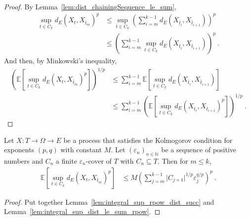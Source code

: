 \begin{proof}

By Lemma~\ref{lem:dist_chainingSequence_le_sum},
\begin{align*}
  \sup_{t \in C_k} d_E(X_t, X_{\bar{t}_m})^p
  &\le \sup_{t \in C_k} \left( \sum_{i=m}^{k-1} d_E(X_{\bar{t}_i}, X_{\bar{t}_{i+1}}) \right)^p
  \\
  &\le \left( \sum_{i=m}^{k-1} \sup_{t \in C_k} d_E(X_{\bar{t}_i}, X_{\bar{t}_{i+1}}) \right)^p
  \: .
\end{align*}
And then, by Minkowski's inequality,
\begin{align*}
  \left(\mathbb{E} \left[\sup_{t \in C_k} d_E(X_t, X_{\bar{t}_m})^p \right]\right)^{1/p}
  &\le \sum_{i=m}^{k-1} \mathbb{E} \left[\sup_{t \in C_k} d_E(X_{\bar{t}_i}, X_{\bar{t}_{i+1}}) \right]
  \\
  &\le \sum_{i=m}^{k-1} \left( \mathbb{E}\left[\sup_{t \in C_k} d_E(X_{\bar{t}_i}, X_{\bar{t}_{i+1}})^p \right] \right)^{1/p}
  \: .
\end{align*}
\end{proof}


\begin{lemma}\label{lem:integral_sup_rpow_dist_le_sum}
  \leanok
Let $X : T \to \Omega \to E$ be a process that satisfies the Kolmogorov condition for exponents $(p,q)$ with constant $M$.
Let $(\varepsilon_n)_{n \in \mathbb{N}}$ be a sequence of positive numbers and $C_n$ a finite $\varepsilon_n$-cover of $T$ with $C_n \subseteq T$.
Then for $m \le k$,
\begin{align*}
  \mathbb{E} \left[\sup_{t \in C_k} d_E(X_t, X_{\bar{t}_m})^p \right]
  &\le M \left( \sum_{j=m}^{k-1} \vert C_{j+1} \vert^{1/p} \varepsilon_j^{q/p} \right)^p
  \: .
\end{align*}
\end{lemma}

\begin{proof}
Put together Lemma~\ref{lem:integral_sup_rpow_dist_succ} and Lemma~\ref{lem:integral_sup_dist_le_sum_rpow}.
\end{proof}



